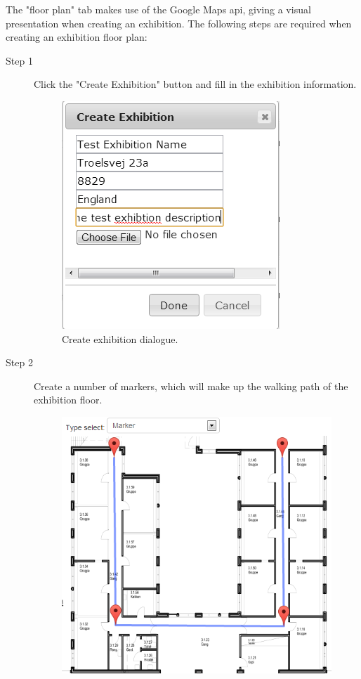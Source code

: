 The "floor plan" tab makes use of the Google Maps \ac{api}, giving a visual presentation when creating an exhibition.
The following steps are required when creating an exhibition floor plan:
\begin{description}
	\item[Step 1] Click the "Create Exhibition" button and fill in the exhibition information.
	\begin{figure}[H]
		\centering
		\includegraphics[scale=0.5]{img/website/step2.png}
		\caption{Create exhibition dialogue.\label{fig:websitestep1}}
	\end{figure}
	\item[Step 2] Create a number of markers, which will make up the walking path of the exhibition floor.
	\begin{figure}[H]
		\centering
		\includegraphics[scale=0.5]{img/website/step3.png}

\end{figure}
\end{description}
